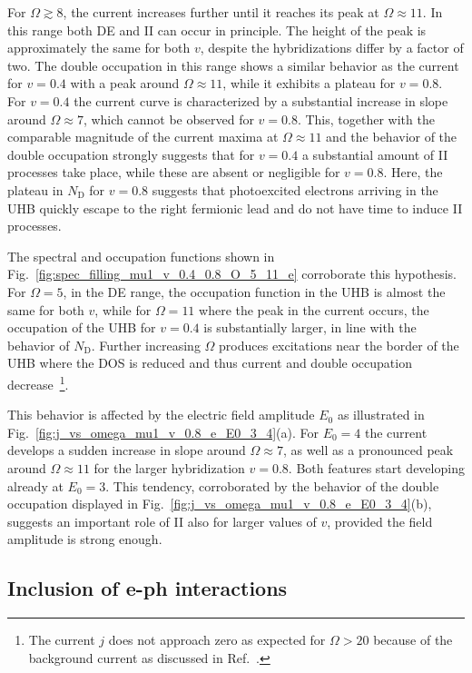 \documentclass[aps,prb,groupedaddress,showpacs,twocolumn,superscriptaddress,10pt]{revtex4-2}
\begin{document}
For $\Omega\gtrsim8$, the current increases further until it reaches its peak at $\Omega\approx 11$. In this range both DE and II can occur in principle. The height of the peak is approximately the same for both $v$, despite the hybridizations differ by a factor of two. The double occupation in this range shows a similar behavior as the current for $v=0.4$ with a peak around $\Omega\approx 11$, while it exhibits a plateau for $v=0.8$. For $v=0.4$ the current curve is characterized by a substantial increase in slope around $\Omega \approx 7$, which cannot be observed for $v=0.8$. This, together with the comparable magnitude of the current maxima at $\Omega\approx 11$ and the behavior of the double occupation strongly suggests that for $v=0.4$ a substantial amount of II processes take place, while these are absent or negligible for $v=0.8$. Here, the plateau in $N_{\text{D}}$ for $v=0.8$ suggests that photoexcited electrons arriving in the UHB quickly escape to the right fermionic lead and do not have time to induce II processes.

The spectral and occupation functions shown in Fig.~\ref{fig:spec_filling_mu1_v_0.4_0.8_O_5_11_e} corroborate this hypothesis. For $\Omega=5$, in the DE range, the occupation function in the UHB is almost the same for both $v$, while for $\Omega=11$ where the peak in the current occurs, the occupation of the UHB for $v=0.4$ is substantially larger, in line with the behavior of $N_{\text{D}}$. Further increasing $\Omega$ produces excitations near the border of the UHB where the DOS is reduced and thus  current and double occupation decrease~\footnote{The current $j$ does not approach zero as expected for $\Omega>20$ because of the background current as discussed in Ref.~\cite{so.do.18}.}.

This behavior is affected by the electric field amplitude $E_0$ as illustrated in Fig.~\ref{fig:j_vs_omega_mu1_v_0.8_e_E0_3_4}(a). For $E_0=4$ the current develops a sudden increase in slope around $\Omega\approx7$, as well as a pronounced peak around $\Omega\approx 11$ for the larger hybridization $v=0.8$. Both features start developing already at $E_0=3$. This tendency, corroborated by the behavior of the double occupation displayed in Fig.~\ref{fig:j_vs_omega_mu1_v_0.8_e_E0_3_4}(b), suggests an  important role of II also for larger values of $v$, provided the field amplitude is strong enough.
 
 
\subsection{Inclusion of e-ph interactions}
\label{sec:E0_2_electrons_phonons} 
\end{document}
